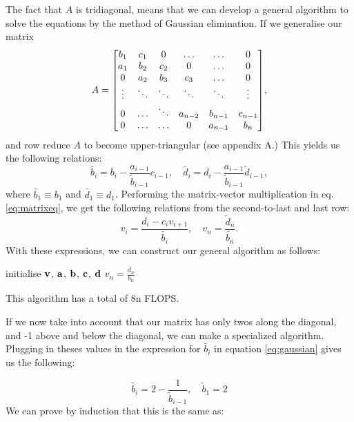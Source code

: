 The fact that $A$ is tridiagonal, means that we can develop a general algorithm
to solve the equations by the method of Gaussian elimination. If we generalise
our matrix
  \[A =
    \mqty[b_1 & c_1 & 0 & \hdots & \hdots & 0 \\
          a_1 & b_2 & c_2 & 0 & \hdots & 0 \\
          0 & a_2 & b_3 & c_3 & \hdots & 0 \\
          \vdots & \ddots & \ddots & \ddots & \ddots & \vdots \\
          0 & \hdots & \ddots & a_{n-2} & b_{n-1} & c_{n-1} \\
          0 & \hdots & \hdots & 0 & a_{n-1} & b_n],
  \]
and row reduce $A$ to become upper-triangular (see appendix A.)
This yields us the following relations:
  \begin{equation}  \label{eq:gaussian}
    \widetilde{b_i} = b_i - \frac{a_{i-1}}{\tilde{b}_{i-1}}c_{i-1}, \quad
    \widetilde{d_i} = d_i - \frac{a_{i-1}}{\tilde{b}_{i-1}}\tilde{d}_{i-1},
  \end{equation}
where $\widetilde{b_1} \equiv b_1$ and $\widetilde{d_1} \equiv d_1$.
Performing the matrix-vector multiplication in eq. \ref{eq:matrixeq}, we get
the following relations from the second-to-last and last row:
  \begin{equation}
    v_i = \frac{d_i - c_iv_{i+1}}{\widetilde{b_i}}, \quad
    v_n = \frac{\widetilde{d}_n}{\widetilde{b_n}}.
  \end{equation}
With these expressions, we can construct our general algorithm as follows:
  \begin{algorithm}[h!]
    \SetAlgoLined
    initialise $\vb{v}$, $\vb{a}$, $\vb{b}$, $\vb{c}$, $\vb{d}$\;
    $v_n = \frac{d_n}{b_n}$\;
  \end{algorithm}
  
This algorithm has a total of 8n FLOPS. 

If we now take into account that our matrix has only twos along the diagonal, and -1 above and below the diagonal, we can make a specialized algorithm. Plugging in theses values in the expression for $\widetilde{b_i}$ in equation \ref{eq:gaussian} gives us the following: 

	\begin{equation}
	\widetilde{b_i}=2-\frac{1}{\widetilde{b}_{i-1}}, \quad \widetilde{b}_1=2
	\end{equation}
We can prove by induction that this is the same as:

